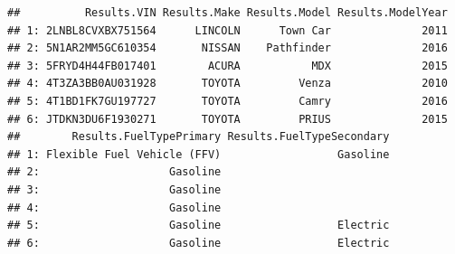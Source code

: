\documentclass[]{book}
\newenvironment{Shaded}{\begin{snugshade}}{\end{snugshade}}
\newcommand{\CommentTok}[1]{\textcolor[rgb]{0.56,0.35,0.01}{\textit{#1}}}
\newcommand{\ControlFlowTok}[1]{\textcolor[rgb]{0.13,0.29,0.53}{\textbf{#1}}}
\newcommand{\KeywordTok}[1]{\textcolor[rgb]{0.13,0.29,0.53}{\textbf{#1}}}
\newcommand{\NormalTok}[1]{#1}
\newcommand{\OtherTok}[1]{\textcolor[rgb]{0.56,0.35,0.01}{#1}}
\newcommand{\StringTok}[1]{\textcolor[rgb]{0.31,0.60,0.02}{#1}}
\begin{document}
\begin{Shaded}
\end{Shaded}

\begin{verbatim}
##          Results.VIN Results.Make Results.Model Results.ModelYear
## 1: 2LNBL8CVXBX751564      LINCOLN      Town Car              2011
## 2: 5N1AR2MM5GC610354       NISSAN    Pathfinder              2016
## 3: 5FRYD4H44FB017401        ACURA           MDX              2015
## 4: 4T3ZA3BB0AU031928       TOYOTA         Venza              2010
## 5: 4T1BD1FK7GU197727       TOYOTA         Camry              2016
## 6: JTDKN3DU6F1930271       TOYOTA         PRIUS              2015
##        Results.FuelTypePrimary Results.FuelTypeSecondary
## 1: Flexible Fuel Vehicle (FFV)                  Gasoline
## 2:                    Gasoline                          
## 3:                    Gasoline                          
## 4:                    Gasoline                          
## 5:                    Gasoline                  Electric
## 6:                    Gasoline                  Electric
\end{verbatim}
\end{document}
